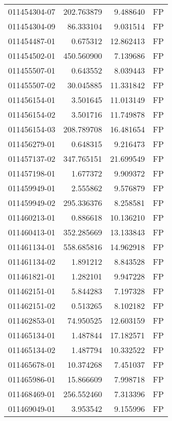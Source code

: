 \begin{tabular}{lrrl}
011454304-07 &  202.763879 &       9.488640 &   FP \\
011454304-09 &   86.333104 &       9.031514 &   FP \\
011454487-01 &    0.675312 &      12.862413 &   FP \\
011454502-01 &  450.560900 &       7.139686 &   FP \\
011455507-01 &    0.643552 &       8.039443 &   FP \\
011455507-02 &   30.045885 &      11.331842 &   FP \\
011456154-01 &    3.501645 &      11.013149 &   FP \\
011456154-02 &    3.501716 &      11.749878 &   FP \\
011456154-03 &  208.789708 &      16.481654 &   FP \\
011456279-01 &    0.648315 &       9.216473 &   FP \\
011457137-02 &  347.765151 &      21.699549 &   FP \\
011457198-01 &    1.677372 &       9.909372 &   FP \\
011459949-01 &    2.555862 &       9.576879 &   FP \\
011459949-02 &  295.336376 &       8.258581 &   FP \\
011460213-01 &    0.886618 &      10.136210 &   FP \\
011460413-01 &  352.285669 &      13.133843 &   FP \\
011461134-01 &  558.685816 &      14.962918 &   FP \\
011461134-02 &    1.891212 &       8.843528 &   FP \\
011461821-01 &    1.282101 &       9.947228 &   FP \\
011462151-01 &    5.844283 &       7.197328 &   FP \\
011462151-02 &    0.513265 &       8.102182 &   FP \\
011462853-01 &   74.950525 &      12.603159 &   FP \\
011465134-01 &    1.487844 &      17.182571 &   FP \\
011465134-02 &    1.487794 &      10.332522 &   FP \\
011465678-01 &   10.374268 &       7.451037 &   FP \\
011465986-01 &   15.866609 &       7.998718 &   FP \\
011468469-01 &  256.552460 &       7.313396 &   FP \\
011469049-01 &    3.953542 &       9.155996 &   FP \\

\end{tabular}
